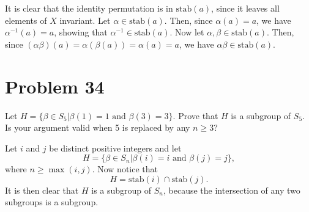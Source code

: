 \documentclass[12pt]{article}
\newcommand{\stab}{\mbox{stab}}
\begin{document}
It is clear that the identity permutation is in $\stab(a)$, since it leaves all elements
of $X$ invariant.  Let $\alpha\in\stab(a)$.  Then, since $\alpha(a)=a$, we have
$\alpha^{-1}(a)=a$, showing that $\alpha^{-1}\in\stab(a)$.  Now let $\alpha,\beta\in\stab(a)$.
Then, since $(\alpha\beta)(a)=\alpha(\beta(a))=\alpha(a)=a$, we have
$\alpha\beta\in\stab(a)$.

\section*{Problem 34}

Let $H=\{\beta\in S_5|\mbox{$\beta(1)=1$ and $\beta(3)=3$}\}$.  Prove that $H$ is a subgroup of
$S_5$.  Is your argument valid when 5 is replaced by any $n\geq 3$?

Let $i$ and $j$ be distinct positive integers and let
\begin{equation*}
H=\{\beta\in S_n|\mbox{$\beta(i)=i$ and $\beta(j)=j$}\},
\end{equation*}
where $n\geq\max(i,j)$.  Now notice that
\begin{equation*}
H = \stab(i)\cap\stab(j).
\end{equation*}
It is then clear that $H$ is a subgroup of $S_n$, because the intersection
of any two subgroups is a subgroup.
\end{document}
